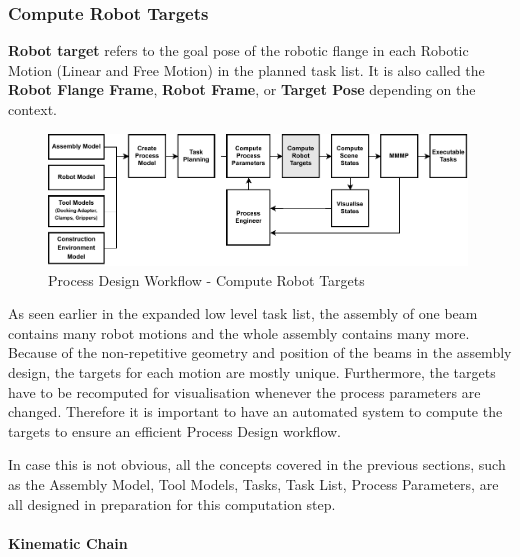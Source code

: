 \FloatBarrier

\subsubsection{Compute Robot Targets}
\label{subsubsection:exploration-3-compute-robot-targets}

\textbf{Robot target }refers to the goal pose of the robotic flange in each Robotic Motion (Linear and Free Motion) in the planned task list. It is also called the \textbf{Robot Flange Frame}, \textbf{Robot Frame}, or \textbf{Target Pose} depending on the context. 

\begin{figure}[!h]
    \centering
    \includegraphics[width=0.99\textwidth]{images/6a/process_4.pdf}
    \caption{Process Design Workflow - Compute Robot Targets}
    \label{fig:process-design-4}
\end{figure}

As seen earlier in the expanded low level task list, the assembly of one beam contains many robot motions and the whole assembly contains many more. Because of the non-repetitive geometry and position of the beams in the assembly design, the targets for each motion are mostly unique. Furthermore, the targets have to be recomputed for visualisation whenever the process parameters are changed. Therefore it is important to have an automated system to compute the targets to ensure an efficient Process Design workflow.

In case this is not obvious, all the concepts covered in the previous sections, such as the Assembly Model, Tool Models, Tasks, Task List, Process Parameters, are all designed in preparation for this computation step. 

\paragraph{Kinematic Chain}

